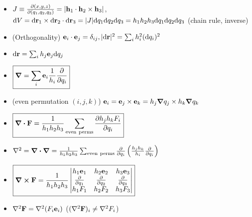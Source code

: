 \documentclass{article}
\theoremstyle{remark}
\theoremstyle{remark}
\begin{document}
\begin{enumerate}
\begin{itemize}
            \item $J\equiv\pdv{(x,y,z)}{(q_1,q_2,q_3)}=|\vb{h}_1\cdot\vb{h}_2\times\vb{h}_3| $, $\dd V = \dd\vb{r}_1\times\dd\vb{r}_2\cdot\dd\vb{r}_3 = |J|\dd q_1\dd q_2\dd q_3 = h_1 h_2 h_3\dd q_1\dd q_2\dd q_3 $ (chain rule, inverse)
            \item (Orthogonality) $\vb{e}_i\cdot\vb{e}_j=\delta_{ij}, |\dd\vb{r}|^2=\sum_{i}h_i^2(\dd q_i)^2 $
            \item $\dd\vb{r}=\sum_i h_j\vb{e}_j\dd q_j $
            \item $\boxed{\grad=\sum_i\vb{e}_i\frac{1}{h_i}\pdv{q_i}} $
            \item (even permutation $(i,j,k)$) $\vb{e}_i=\vb{e}_j\times\vb{e}_k = h_j\grad q_j\times h_k\grad q_k $
            \item $\boxed{\div\vb{F}=\frac{1}{h_1 h_2 h_3}\sum_{\mathrm{even\ perms}}\pdv{h_j h_k F_i}{q_i}} $
            \item $\laplacian = \div\grad = \frac{1}{h_1 h_2 h_3}\sum_{\mathrm{even\ perms}}\pdv{q_i}\left(\frac{h_j h_k}{h_i}\pdv{q_i}\right) $
            \item $\boxed{\curl\vb{F}=\frac{1}{h_1 h_2 h_3}\begin{vmatrix}
                h_1\vb{e}_1 & h_2\vb{e}_2 & h_3\vb{e}_3\\
                \pdv{q_1} & \pdv{q_2} & \pdv{q_3}\\
                h_1F_1 & h_2F_2 & h_3F_3
            \end{vmatrix}} $
            \item $\laplacian\vb{F}=\laplacian(F_i\vb{e}_i) $  ($(\laplacian\vb{F})_i \neq \laplacian F_i $)
        \end{itemize}
    \end{enumerate}
\end{document}
